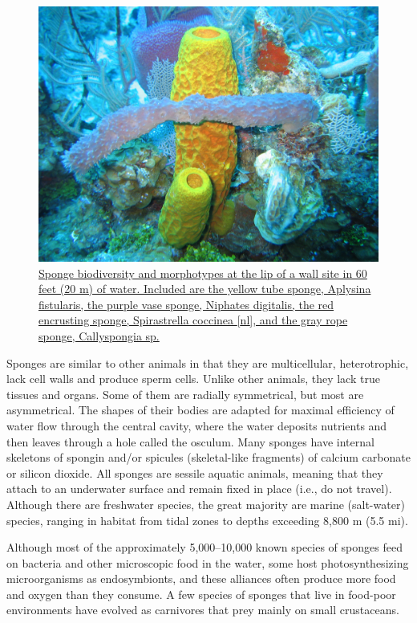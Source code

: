 \begin{figure}

{\centering \includegraphics[width=0.7\linewidth]{./figures/animals/Reef3859_-_Flickr_-_NOAA_Photo_Library} 

}

\caption{\href{https://commons.wikimedia.org/wiki/File:Reef3859_-_Flickr_-_NOAA_Photo_Library.jpg}{Sponge biodiversity and morphotypes at the lip of a wall site in 60 feet (20 m) of water. Included are the yellow tube sponge, Aplysina fistularis, the purple vase sponge, Niphates digitalis, the red encrusting sponge, Spirastrella coccinea {[}nl{]}, and the gray rope sponge, Callyspongia sp.}}\label{fig:spongediversity}
\end{figure}

Sponges are similar to other animals in that they are multicellular, heterotrophic, lack cell walls and produce sperm cells. Unlike other animals, they lack true tissues and organs. Some of them are radially symmetrical, but most are asymmetrical. The shapes of their bodies are adapted for maximal efficiency of water flow through the central cavity, where the water deposits nutrients and then leaves through a hole called the osculum. Many sponges have internal skeletons of spongin and/or spicules (skeletal-like fragments) of calcium carbonate or silicon dioxide. All sponges are sessile aquatic animals, meaning that they attach to an underwater surface and remain fixed in place (i.e., do not travel). Although there are freshwater species, the great majority are marine (salt-water) species, ranging in habitat from tidal zones to depths exceeding 8,800 m (5.5 mi).

Although most of the approximately 5,000--10,000 known species of sponges feed on bacteria and other microscopic food in the water, some host photosynthesizing microorganisms as endosymbionts, and these alliances often produce more food and oxygen than they consume. A few species of sponges that live in food-poor environments have evolved as carnivores that prey mainly on small crustaceans.

